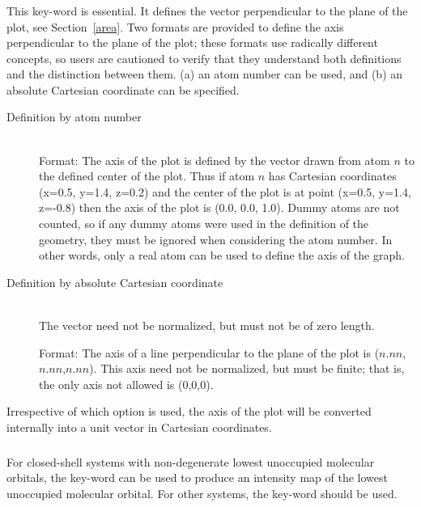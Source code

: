 \subsubsection*{}
This key-word is essential. It defines the vector perpendicular to the plane
of the plot, see Section~\ref{area}. Two formats are provided to define the axis
perpendicular to the plane of the plot; these formats use radically different
concepts, so users are cautioned to verify that they understand both
definitions and the distinction between them.
(a) an atom number can be used, and (b) an absolute Cartesian coordinate
can be specified.

\begin{description}
\item[Definition by atom number]~\\
Format:   The axis of the plot is defined  by the vector drawn
from  atom $n$ to the defined center of the plot. Thus if atom $n$ has
Cartesian coordinates (x=0.5, y=1.4, z=0.2) and the center of the plot is at
point (x=0.5, y=1.4, z=-0.8) then the axis of the plot is (0.0, 0.0, 1.0).
Dummy atoms are not counted, so if any dummy atoms were used in the definition
of the geometry, they must be ignored when considering the atom number. In
other words, only a real atom can be used to define the axis of the graph.

\item[Definition by absolute Cartesian coordinate]~\\
The vector need not be  normalized, but must not be of zero length.

Format:  The axis of a  line perpendicular to
the plane of the plot is ($n.nn$,$n.nn$,$n.nn$). This axis need not be
normalized, but must be finite; that is, the only axis not allowed is (0,0,0).
\end{description}

Irrespective of which option is used, the axis of the plot will be converted
internally into a unit vector in Cartesian coordinates.

\subsubsection*{}
For closed-shell systems with non-degenerate lowest unoccupied molecular
orbitals, the key-word  can be used to produce an intensity map of
the lowest unoccupied molecular orbital. For other systems, the key-word
 should be used.

